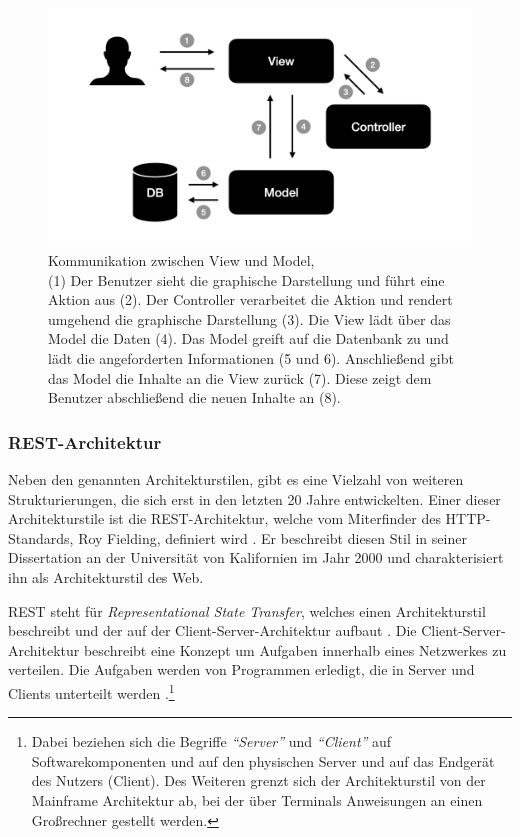  \begin{figure}
 	\centering
    \includegraphics[width=.6\textwidth]{Assets/Interaktionsorientiert.002}
	\caption[Kommunikation zwischen View und Model]{Kommunikation zwischen View und Model, \\ (1) Der Benutzer sieht die graphische Darstellung und führt eine Aktion aus (2). Der Controller verarbeitet die Aktion und rendert umgehend die graphische Darstellung (3). Die View lädt über das Model die Daten (4). Das Model greift auf die Datenbank zu und lädt die angeforderten Informationen (5 und 6). Anschließend gibt das Model die Inhalte an die View zurück (7). Diese zeigt dem Benutzer abschließend die neuen Inhalte an (8).}
    \label{fig:mvc-vm-kommunikation}
 \end{figure}

\subsubsection{REST-Architektur}
\label{sec:rest}

Neben den genannten Architekturstilen, gibt es eine Vielzahl von weiteren Strukturierungen, die sich erst in den letzten 20 Jahre entwickelten. Einer dieser Architekturstile ist die REST-Architektur, welche vom Miterfinder des HTTP-Standards, Roy Fielding, definiert wird \parencite[][S. 128]{starke_effektive_2015}. Er beschreibt diesen Stil in seiner Dissertation an der Universität von Kalifornien im Jahr 2000 und charakterisiert ihn als Architekturstil des Web.

REST steht für \textit{Representational State Transfer}, welches einen Architekturstil beschreibt und der auf der Client-Server-Architektur aufbaut \parencite[][S. 76]{fielding_architectural_2000}.
Die Client-Server-Architektur beschreibt eine Konzept um Aufgaben innerhalb eines Netzwerkes zu verteilen. Die Aufgaben werden von Programmen erledigt, die in Server und Clients unterteilt werden \parencite[][S. 117]{starke_effektive_2015}.\footnote{Dabei beziehen sich die Begriffe \textit{\enquote{Server}} und \textit{\enquote{Client}} auf Softwarekomponenten und auf den physischen Server und auf das Endgerät des Nutzers (Client). Des Weiteren grenzt sich der Architekturstil von der Mainframe Architektur ab, bei der über Terminals Anweisungen an einen Großrechner gestellt werden.}

